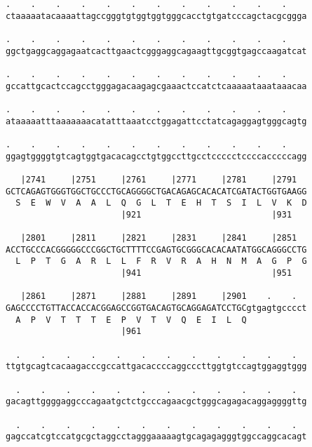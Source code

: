 \documentclass{article}
\begin{document}
\begin{Verbatim}
.    .    .    .    .    .    .    .    .    .    .    .    
ctaaaaatacaaaattagccgggtgtggtggtgggcacctgtgatcccagctacgcggga
                                                            
.    .    .    .    .    .    .    .    .    .    .    .    
ggctgaggcaggagaatcacttgaactcgggaggcagaagttgcggtgagccaagatcat
                                                            
.    .    .    .    .    .    .    .    .    .    .    .    
gccattgcactccagcctgggagacaagagcgaaactccatctcaaaaataaataaacaa
                                                            
.    .    .    .    .    .    .    .    .    .    .    .    
ataaaaatttaaaaaaacatatttaaatcctggagattcctatcagaggagtgggcagtg
                                                            
.    .    .    .    .    .    .    .    .    .    .    .    
ggagtggggtgtcagtggtgacacagcctgtggccttgcctccccctccccacccccagg
                                                            
   |2741     |2751     |2761     |2771     |2781     |2791  
GCTCAGAGTGGGTGGCTGCCCTGCAGGGGCTGACAGAGCACACATCGATACTGGTGAAGG
  S  E  W  V  A  A  L  Q  G  L  T  E  H  T  S  I  L  V  K  D
                       |921                          |931   
  
   |2801     |2811     |2821     |2831     |2841     |2851  
ACCTGCCCACGGGGGCCCGGCTGCTTTTCCGAGTGCGGGCACACAATATGGCAGGGCCTG
  L  P  T  G  A  R  L  L  F  R  V  R  A  H  N  M  A  G  P  G
                       |941                          |951   
  
   |2861     |2871     |2881     |2891     |2901    .    .  
GAGCCCCTGTTACCACCACGGAGCCGGTGACAGTGCAGGAGATCCTGCgtgagtgcccct
  A  P  V  T  T  T  E  P  V  T  V  Q  E  I  L  Q            
                       |961                                 
  
  .    .    .    .    .    .    .    .    .    .    .    .  
ttgtgcagtcacaagacccgccattgacaccccaggcccttggtgtccagtggaggtggg
                                                            
  .    .    .    .    .    .    .    .    .    .    .    .  
gacagttggggaggcccagaatgctctgcccagaacgctgggcagagacaggaggggttg
                                                            
  .    .    .    .    .    .    .    .    .    .    .    .  
gagccatcgtccatgcgctaggcctagggaaaaagtgcagagagggtggccaggcacagt
                                                            

\end{Verbatim}
\end{document}
